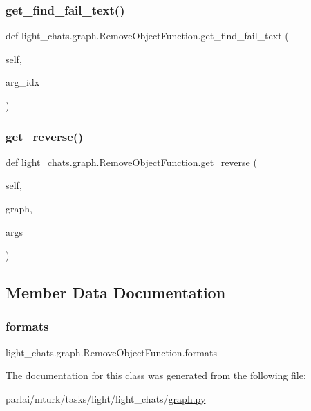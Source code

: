 \subsubsection{\texorpdfstring{get\+\_\+find\+\_\+fail\+\_\+text()}{get\_find\_fail\_text()}}
{\footnotesize\ttfamily def light\+\_\+chats.\+graph.\+Remove\+Object\+Function.\+get\+\_\+find\+\_\+fail\+\_\+text (\begin{DoxyParamCaption}\item[{}]{self,  }\item[{}]{arg\+\_\+idx }\end{DoxyParamCaption})}

\mbox{\label{classlight__chats_1_1graph_1_1RemoveObjectFunction_a25e0182ea553e22cc861479aabd6a989}} 
\subsubsection{\texorpdfstring{get\+\_\+reverse()}{get\_reverse()}}
{\footnotesize\ttfamily def light\+\_\+chats.\+graph.\+Remove\+Object\+Function.\+get\+\_\+reverse (\begin{DoxyParamCaption}\item[{}]{self,  }\item[{}]{graph,  }\item[{}]{args }\end{DoxyParamCaption})}



\subsection{Member Data Documentation}
\mbox{\label{classlight__chats_1_1graph_1_1RemoveObjectFunction_a67165948c1e8f963e79aac98baf91509}} 
\subsubsection{\texorpdfstring{formats}{formats}}
{\footnotesize\ttfamily light\+\_\+chats.\+graph.\+Remove\+Object\+Function.\+formats}



The documentation for this class was generated from the following file\+:\begin{DoxyCompactItemize}
\item 
parlai/mturk/tasks/light/light\+\_\+chats/\hyperlink{parlai_2mturk_2tasks_2light_2light__chats_2graph_8py}{graph.\+py}\end{DoxyCompactItemize}

